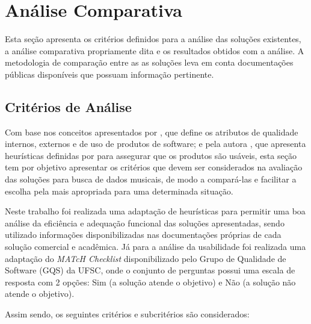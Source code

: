 \section{Análise Comparativa} \label{cap:analiseResultados}
Esta seção apresenta os critérios definidos para a análise das soluções existentes, a análise comparativa propriamente dita e os resultados obtidos com a análise. A metodologia de comparação entre as as soluções leva em conta documentações públicas disponíveis que possuam informação pertinente.

\subsection{Critérios de Análise} \label{sec:criterios-analise}

Com base nos conceitos apresentados por \cite{wazlawick2012}, que define os atributos de qualidade internos, externos e de uso de produtos de software; e pela autora \cite{wangenheim2017}, que apresenta heurísticas definidas por \cite{nielsen1995} para assegurar que os produtos são usáveis, esta seção tem por objetivo apresentar os critérios que devem ser considerados na avaliação das soluções para busca de dados musicais, de modo a compará-las e facilitar a escolha pela mais apropriada para uma determinada situação.

Neste trabalho foi realizada uma adaptação de heurísticas para permitir uma boa análise da eficiência e adequação funcional das soluções apresentadas, sendo utilizado informações disponibilizadas nas documentações próprias de cada solução comercial e acadêmica. Já para a análise da usabilidade foi realizada uma adaptação do \textit{MATcH Checklist} disponibilizado pelo Grupo de Qualidade de Software (GQS) da UFSC, onde o conjunto de perguntas possui uma escala de resposta com 2 opções: Sim (a solução atende o objetivo) e Não (a solução não atende o objetivo).

Assim sendo, os seguintes critérios e subcritérios são considerados:

